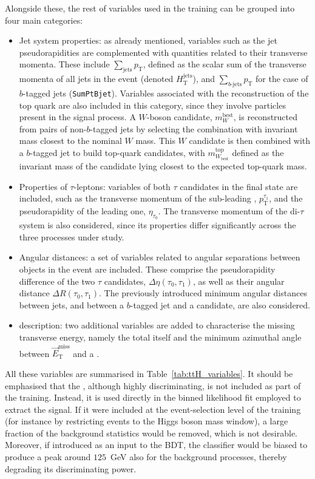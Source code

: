 Alongside these, the rest of variables used in the training can be grouped into four main categories:  
\begin{itemize}
    \item Jet system properties: as already mentioned, variables such as the jet pseudorapidities are complemented with quantities related to their transverse momenta. These include $\sum_{\text{jets}}p_{\text{T}}$, defined as the scalar sum of the transverse momenta of all jets in the event (denoted $H^{\text{jets}}_{\text{T}}$), and $\sum_{b\text{-jets}}p_{\text{T}}$ for the case of $b$-tagged jets (\texttt{SumPtBjet}). Variables associated with the reconstruction of the top quark are also included in this category, since they involve particles present in the signal process. A $W$-boson candidate, $m^{\text{best}}_{W}$, is reconstructed from pairs of non-$b$-tagged jets by selecting the combination with invariant mass closest to the nominal $W$ mass. This $W$ candidate is then combined with a $b$-tagged jet to build top-quark candidates, with $m^{\text{top}}_{W_{\text{best}}}$ defined as the invariant mass of the candidate lying closest to the expected top-quark mass.
    \item Properties of $\tau$-leptons: variables of both $\tau$ candidates in the final state are included, such as the transverse momentum of the sub-leading \tauhad, $p^{\tau_1}_{\text{T}}$, and the pseudorapidity of the leading one, $\eta_{\tau_0}$. The transverse momentum of the di-$\tau$ system is also considered, since its properties differ significantly across the three processes under study.
    \item Angular distances: a set of variables related to angular separations between objects in the event are included. These comprise the pseudorapidity difference of the two $\tau$ candidates, $\Delta\eta(\tau_0,\tau_1)$, as well as their angular distance $\Delta R(\tau_0,\tau_1)$. The previously introduced minimum angular distances between jets, and between a $b$-tagged jet and a \tauhad candidate, are also considered.
    \item \etmiss description: two additional variables are added to characterise the missing transverse energy, namely the total \etmiss itself and the minimum azimuthal angle between $\vec{E}^{\text{miss}}_{\text{T}}$ and a \tauhad.
\end{itemize}

All these variables are summarised in Table~\ref{tab:ttH_variables}. It should be emphasised that the \mmc, although highly discriminating, is not included as part of the training. Instead, it is used directly in the binned likelihood fit employed to extract the signal. If it were included at the event-selection level of the training (for instance by restricting events to the Higgs boson mass window), a large fraction of the background statistics would be removed, which is not desirable. Moreover, if introduced as an input to the BDT, the classifier would be biased to produce a peak around $125$~GeV also for the background processes, thereby degrading its discriminating power.

